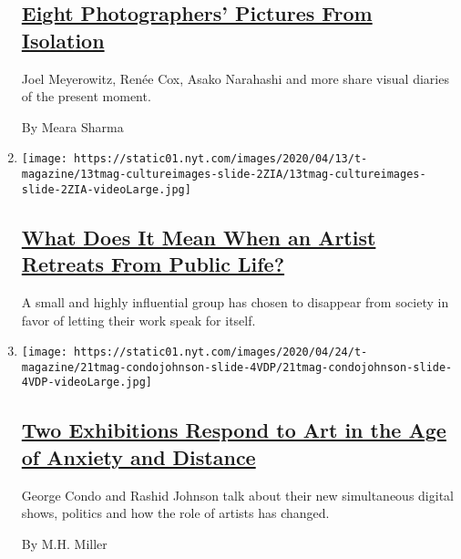 \begin{enumerate}
{  \subsection{\texorpdfstring{\href{/2020/04/29/t-magazine/photographers-coronavirus-isolation.html}{Eight
  Photographers' Pictures From
  Isolation}}{Eight Photographers' Pictures From Isolation}}\label{eight-photographers-pictures-from-isolation}}

  Joel Meyerowitz, Renée Cox, Asako Narahashi and more share visual
  diaries of the present moment.

  By Meara Sharma
\item
  \texttt{[image: https://static01.nyt.com/images/2020/04/13/t-magazine/13tmag-cultureimages-slide-2ZIA/13tmag-cultureimages-slide-2ZIA-videoLarge.jpg]}

  \hypertarget{what-does-it-mean-when-an-artist-retreats-from-public-life}{%
  \subsection{\texorpdfstring{\href{/interactive/2020/04/13/t-magazine/artist-recluse.html}{What
  Does It Mean When an Artist Retreats From Public
  Life?}}{What Does It Mean When an Artist Retreats From Public Life?}}\label{what-does-it-mean-when-an-artist-retreats-from-public-life}}

  A small and highly influential group has chosen to disappear from
  society in favor of letting their work speak for itself.
\item
  \texttt{[image: https://static01.nyt.com/images/2020/04/24/t-magazine/21tmag-condojohnson-slide-4VDP/21tmag-condojohnson-slide-4VDP-videoLarge.jpg]}

  \hypertarget{two-exhibitions-respond-to-art-in-the-age-of-anxiety-and-distance}{%
  \subsection{\texorpdfstring{\href{/2020/04/24/t-magazine/george-condo-rashid-johnson-art.html}{Two
  Exhibitions Respond to Art in the Age of Anxiety and
  Distance}}{Two Exhibitions Respond to Art in the Age of Anxiety and Distance}}\label{two-exhibitions-respond-to-art-in-the-age-of-anxiety-and-distance}}

  George Condo and Rashid Johnson talk about their new simultaneous
  digital shows, politics and how the role of artists has changed.

  By M.H. Miller
\end{enumerate}

